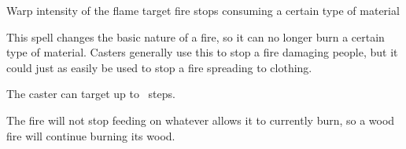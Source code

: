 
  {\mFire}%
  {Warp}%
  {\duplicated}%
  {intensity of the flame}%
  {target fire stops consuming a certain type of material}%
  {
    This spell changes the basic nature of a fire, so it can no longer burn a certain type of material.
    Casters generally use this to stop a fire damaging people, but it could just as easily be used to stop a fire spreading to clothing.

    The caster can target up to \spellArea\ steps.

    The fire will not stop feeding on whatever allows it to currently burn, so a wood fire will continue burning its wood.
  }
